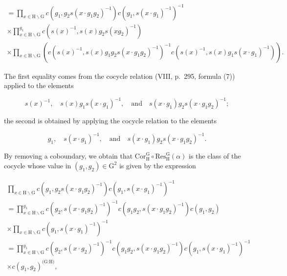 \[
\begin{array}{l} = \prod_ {x \in \mathrm{H} \backslash \mathrm{G}} c (g _ {1}, g _ {2} s (x \cdot g _ {1} g _ {2}) ^ {- 1}) c (g _ {1}, s (x \cdot g _ {1}) ^ {- 1}) ^ {- 1} \\ \times \prod_ {x \in \mathrm{H} \backslash \mathrm{G}} ^ {g _ {1}} c (s (x) ^ {- 1}, s (x) g _ {2} s (x g _ {2}) ^ {- 1}) \\ \times \prod_ {x \in \mathrm{H} \backslash \mathrm{G}} \left(c (s (x) ^ {- 1}, s (x) g _ {1} g _ {2} s (x \cdot g _ {1} g _ {2}) ^ {- 1}) ^ {- 1} c (s (x) ^ {- 1}, s (x) g _ {1} s (x \cdot g _ {1}) ^ {- 1})\right). \end{array}
\]

The first equality comes from the cocycle relation (VIII, p.~295, formula (7)) applied to the elements

\[
s (x) ^ {- 1}, \quad s (x) g _ {1} s (x \cdot g _ {1}) ^ {- 1}, \quad \mathrm{and} \quad s (x \cdot g _ {1}) g _ {2} s (x \cdot g _ {1} g _ {2}) ^ {- 1};
\]

the second is obtained by applying the cocycle relation to the elements

\[
g _ {1}, \quad s (x \cdot g _ {1}) ^ {- 1}, \quad \mathrm{and} \quad s (x \cdot g _ {1}) g _ {2} s (x \cdot g _ {1} g _ {2}) ^ {- 1}.
\]

By removing a coboundary, we obtain that \(\mathrm{Cor}_{\mathrm{H}}^{\mathrm{G}} \circ \mathrm{Res}_{\mathrm{H}}^{\mathrm{G}}(\alpha)\) is the class of the cocycle whose value in \((g_{1}, g_{2}) \in \mathrm{G}^{2}\) is given by the expression

\[
\begin{array}{l} \prod_ {x \in \mathrm{H} \backslash \mathrm{G}} c (g _ {1}, g _ {2} s (x \cdot g _ {1} g _ {2}) ^ {- 1}) c (g _ {1}, s (x \cdot g _ {1}) ^ {- 1}) ^ {- 1} \\ = \prod_ {x \in \mathrm{H} \backslash \mathrm{G}} ^ {g _ {1}} c (g _ {2}, s (x \cdot g _ {1} g _ {2}) ^ {- 1}) ^ {- 1} c (g _ {1} g _ {2}, s (x \cdot g _ {1} g _ {2}) ^ {- 1}) c (g _ {1}, g _ {2}) \\ \times \prod_ {x \in \mathrm{H} \backslash \mathrm{G}} c (g _ {1}, s (x \cdot g _ {1}) ^ {- 1}) ^ {- 1} \\ = \prod_ {x \in \mathrm{H} \backslash \mathrm{G}} ^ {g _ {1}} c (g _ {2}, s (x \cdot g _ {2}) ^ {- 1}) ^ {- 1} c (g _ {1} g _ {2}, s (x \cdot g _ {1} g _ {2}) ^ {- 1}) c (g _ {1}, s (x \cdot g _ {1}) ^ {- 1}) ^ {- 1} \\ \times c (g _ {1}, g _ {2}) ^ {\text {(G:H)}}, \end{array}
\]

